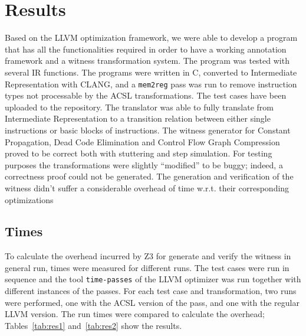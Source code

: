 
\section{Results}
\label{sec:results}

Based on the LLVM optimization framework, we were able to develop a program that has all the functionalities required in order to have a working annotation framework and a witness transformation system. The program was tested with several IR functions. The programs were written in C, converted to Intermediate Representation with CLANG, and a \texttt{mem2reg} pass was run to remove instruction types not processable by the ACSL transformations. The test cases have been uploaded to the repository.
The translator was able to fully translate from Intermediate Representation to a transition relation between either single instructions or basic blocks of instructions. The witness generator for Constant Propagation, Dead Code Elimination and Control Flow Graph Compression proved to be correct both with stuttering and step simulation. For testing purposes the transformations were slightly ``modified'' to be buggy; indeed, a correctness proof could not be generated. The generation and verification of the witness didn't suffer a considerable overhead of time w.r.t. their corresponding optimizations

\subsection{Times}
\label{sub:times}

To calculate the overhead incurred by Z3 for generate and verify the witness in general run, times were measured for different runs. The test cases were run in sequence and the tool \texttt{time-passes} of the LLVM optimizer was run together with different instances of the passes. For each test case and transformation, two runs were performed, one with the ACSL version of the pass, and one with the regular LLVM version. The run times were compared to calculate the overhead; Tables~\ref{tab:res1} and~\ref{tab:res2} show the results.


